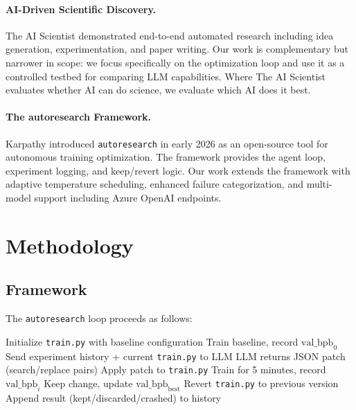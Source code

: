 \documentclass[11pt]{article}
\begin{document}
\paragraph{AI-Driven Scientific Discovery.}
The AI Scientist \citep{lu2024aiscientist} demonstrated end-to-end automated research including idea generation, experimentation, and paper writing. Our work is complementary but narrower in scope: we focus specifically on the optimization loop and use it as a controlled testbed for comparing LLM capabilities. Where The AI Scientist evaluates whether AI can do science, we evaluate which AI does it best.

\paragraph{The autoresearch Framework.}
Karpathy introduced \texttt{autoresearch} in early 2026 \citep{karpathy2026autoresearch} as an open-source tool for autonomous training optimization. The framework provides the agent loop, experiment logging, and keep/revert logic. Our work extends the framework with adaptive temperature scheduling, enhanced failure categorization, and multi-model support including Azure OpenAI endpoints.

\section{Methodology}
\label{sec:methodology}

\subsection{Framework}
\label{sec:framework}

The \texttt{autoresearch} loop proceeds as follows:

\begin{algorithm}[H]
\caption{Autoresearch Optimization Loop}
\label{alg:loop}
\begin{algorithmic}[1]
\STATE Initialize \texttt{train.py} with baseline configuration
\STATE Train baseline, record $\text{val\_bpb}_0$
    \STATE Send experiment history + current \texttt{train.py} to LLM
    \STATE LLM returns JSON patch (search/replace pairs)
    \STATE Apply patch to \texttt{train.py}
    \STATE Train for 5 minutes, record $\text{val\_bpb}_i$
        \STATE Keep change, update $\text{val\_bpb}_{\text{best}}$
    \ELSE
        \STATE Revert \texttt{train.py} to previous version
    \ENDIF
    \STATE Append result (kept/discarded/crashed) to history
\ENDFOR
\end{algorithmic}
\end{algorithm}
\end{document}
